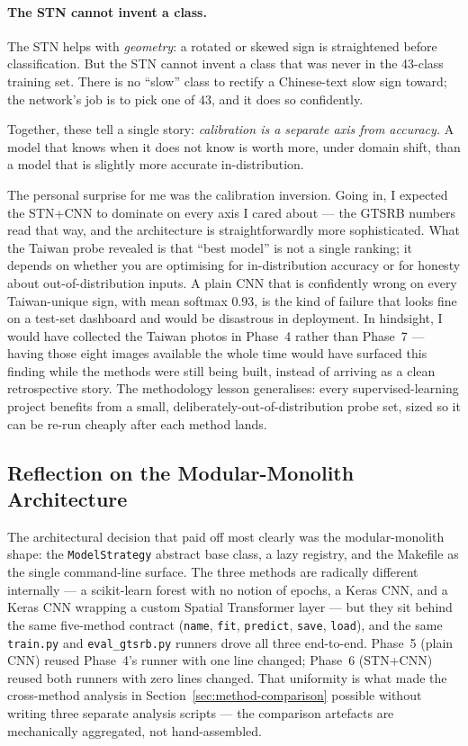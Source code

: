 \documentclass[11pt,a4paper]{article}
\begin{document}
\paragraph{The STN cannot invent a class.} The STN helps with \emph{geometry}: a rotated or skewed sign is straightened before classification. But the STN cannot invent a class that was never in the 43-class training set. There is no ``slow'' class to rectify a Chinese-text slow sign toward; the network's job is to pick one of 43, and it does so confidently.

Together, these tell a single story: \emph{calibration is a separate axis from accuracy.} A model that knows when it does not know is worth more, under domain shift, than a model that is slightly more accurate in-distribution.

The personal surprise for me was the calibration inversion. Going in, I expected the STN+CNN to dominate on every axis I cared about — the GTSRB numbers read that way, and the architecture is straightforwardly more sophisticated. What the Taiwan probe revealed is that ``best model'' is not a single ranking; it depends on whether you are optimising for in-distribution accuracy or for honesty about out-of-distribution inputs. A plain CNN that is confidently wrong on every Taiwan-unique sign, with mean softmax 0.93, is the kind of failure that looks fine on a test-set dashboard and would be disastrous in deployment. In hindsight, I would have collected the Taiwan photos in Phase~4 rather than Phase~7 — having those eight images available the whole time would have surfaced this finding while the methods were still being built, instead of arriving as a clean retrospective story. The methodology lesson generalises: every supervised-learning project benefits from a small, deliberately-out-of-distribution probe set, sized so it can be re-run cheaply after each method lands.

\subsection{Reflection on the Modular-Monolith Architecture}
The architectural decision that paid off most clearly was the modular-monolith shape: the \texttt{ModelStrategy} abstract base class, a lazy registry, and the Makefile as the single command-line surface. The three methods are radically different internally — a scikit-learn forest with no notion of epochs, a Keras CNN, and a Keras CNN wrapping a custom Spatial Transformer layer — but they sit behind the same five-method contract (\texttt{name}, \texttt{fit}, \texttt{predict}, \texttt{save}, \texttt{load}), and the same \texttt{train.py} and \texttt{eval\_gtsrb.py} runners drove all three end-to-end. Phase~5 (plain CNN) reused Phase~4's runner with one line changed; Phase~6 (STN+CNN) reused both runners with zero lines changed. That uniformity is what made the cross-method analysis in Section~\ref{sec:method-comparison} possible without writing three separate analysis scripts — the comparison artefacts are mechanically aggregated, not hand-assembled.
\end{document}

